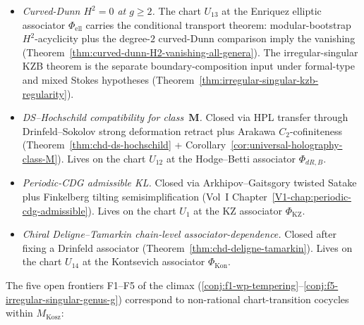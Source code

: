\begin{itemize}
\item \emph{Curved-Dunn $H^{2}=0$ at $g\ge 2$.} The chart
 $U_{13}$ at the Enriquez elliptic associator
 $\Phi_{\mathrm{ell}}$ carries the conditional transport theorem:
 modular-bootstrap \(H^2\)-acyclicity plus the degree-\(2\)
 curved-Dunn comparison imply the vanishing
 (Theorem~\ref{thm:curved-dunn-H2-vanishing-all-genera}). The
 irregular-singular KZB theorem is the separate boundary-composition
 input under formal-type and mixed Stokes hypotheses
 (Theorem~\ref{thm:irregular-singular-kzb-regularity}).
\item \emph{DS--Hochschild compatibility for class~$\mathbf{M}$.}
 Closed via HPL transfer through Drinfeld--Sokolov strong
 deformation retract plus Arakawa $C_{2}$-cofiniteness
 (Theorem~\ref{thm:chd-ds-hochschild} +
 Corollary~\ref{cor:universal-holography-class-M}). Lives on the
 chart $U_{12}$ at the Hodge--Betti associator $\Phi_{dR,B}$.
\item \emph{Periodic-CDG admissible KL.} Closed via Arkhipov--Gaitsgory
 twisted Satake plus Finkelberg tilting semisimplification
 (Vol~I Chapter~\ref{V1-chap:periodic-cdg-admissible}). Lives on
 the chart $U_{1}$ at the KZ associator $\Phi_{\mathrm{KZ}}$.
\item \emph{Chiral Deligne--Tamarkin chain-level associator-dependence.}
 Closed after fixing a Drinfeld associator
 (Theorem~\ref{thm:chd-deligne-tamarkin}). Lives on the chart
 $U_{14}$ at the Kontsevich associator $\Phi_{\mathrm{Kon}}$.
\end{itemize}

The five open frontiers F1--F5 of the climax
(\cref{conj:f1-wp-tempering}--\cref{conj:f5-irregular-singular-genus-g})
correspond to non-rational chart-transition cocycles within
$M_{\mathrm{Kosz}}$:

